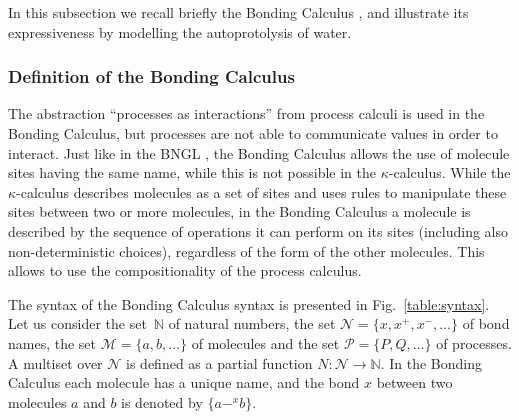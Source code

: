 \documentclass[runningheads]{llncs}
\newcommand{\N}{\mathbb{N}}
\newcommand{\mN}{\mathcal{N}}
\newcommand{\mM}{\mathcal{M}}
\newcommand{\mP}{\mathcal{P}}
\begin{document}
In this subsection we recall briefly the Bonding Calculus \cite{NaCo18}, and 
illustrate its expressiveness by modelling the autoprotolysis of water. 

\subsubsection{Definition of the Bonding Calculus}

The abstraction ``processes as interactions'' from process calculi is used in the Bonding Calculus, but processes are not able to communicate values in order to interact. Just like in the BNGL \cite{pmid19399430}, the Bonding Calculus allows the use of molecule sites having the same name, while this is not possible in the $\kappa$-calculus. While the $\kappa$-calculus describes molecules as a set of sites and uses rules to manipulate these sites between two or more molecules, in the  Bonding Calculus a molecule is described by the sequence of operations it can perform on its sites (including also non-deterministic choices), regardless of the form of the other molecules. This allows to use the compositionality of the process calculus.

The syntax of the Bonding Calculus syntax is presented in Fig.~\ref{table:syntax}. 
Let us consider the set~$\mathbb{N}$ of natural numbers, the set 
$\mN=\{x,x^+,x^-,\dots\}$ of bond names, the set $\mM=\{a,b,\dots\}$ of 
molecules and the set $\mP=\{P,Q,\ldots\}$ of processes. A multiset over 
$\mN$ is defined as a partial function $N:\mN \rightarrow \N$. In the Bonding 
Calculus each molecule has a unique name, and the bond $x$ between two 
molecules $a$ and $b$ is denoted by $\{a-^x b\}$.
\end{document}
